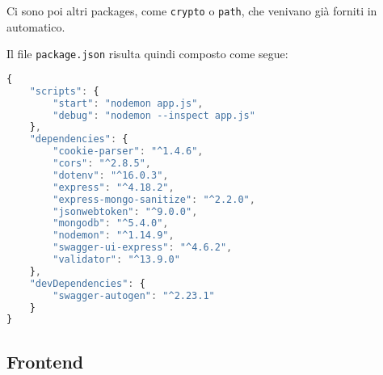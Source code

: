 Ci sono poi altri packages, come \verb|crypto| o \verb|path|, che venivano già forniti in automatico.

Il file \verb|package.json| risulta quindi composto come segue:
\begin{lstlisting}[language=JavaScript]
{
    "scripts": {
        "start": "nodemon app.js",
        "debug": "nodemon --inspect app.js"
    },
    "dependencies": {
        "cookie-parser": "^1.4.6",
        "cors": "^2.8.5",
        "dotenv": "^16.0.3",
        "express": "^4.18.2",
        "express-mongo-sanitize": "^2.2.0",
        "jsonwebtoken": "^9.0.0",
        "mongodb": "^5.4.0",
        "nodemon": "^1.14.9",
        "swagger-ui-express": "^4.6.2",
        "validator": "^13.9.0"
    },
    "devDependencies": {
        "swagger-autogen": "^2.23.1"
    }
}
\end{lstlisting}
\subsection{Frontend}

\newpage